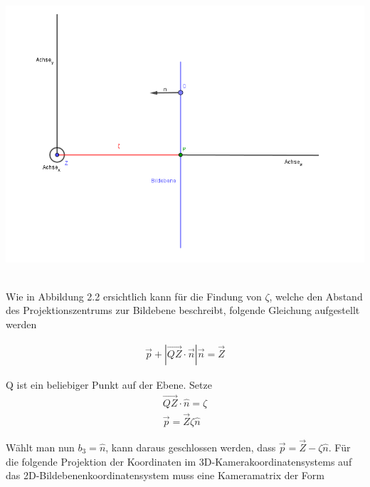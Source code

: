 	\begin{minipage}{\linewidth}
	\centering
	\includegraphics[width=1.\linewidth]{images/ZetaHerleitung.png}
\end{minipage}\\

Wie in Abbildung 2.2 ersichtlich kann für die Findung von $\zeta$, welche den Abstand des Projektionszentrums zur Bildebene beschreibt, folgende Gleichung aufgestellt werden
		
		\begin{gather}
		\vec{p}+|\vec{QZ} \cdot \vec{n}|\vec{n} = \vec{Z}
		\end{gather}
		
		Q ist ein beliebiger Punkt auf der Ebene. Setze
		\begin{gather}
		\vec{QZ} \cdot \hat{n} = \zeta\\
		\vec{p}= \vec{Z}\zeta \hat{n}
		\end{gather}
		
		Wählt man nun  $b_3 = \hat{n}$, kann daraus geschlossen werden, dass $\vec{p} = \vec{Z} - \zeta \hat{n}$. Für die folgende Projektion der Koordinaten im 3D-Kamerakoordinatensystems auf das 2D-Bildebenenkoordinatensystem muss eine Kameramatrix der Form		
		
